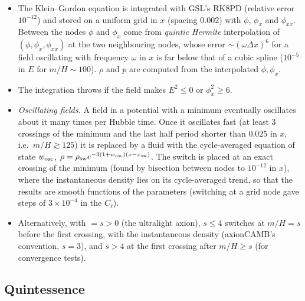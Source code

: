 \begin{implementation}
\begin{itemize}
\item The Klein--Gordon equation is integrated with GSL's RK8PD (relative error $10^{-12}$) and stored on a uniform
      grid in $x$ (spacing $0.002$) with $\phi$, $\phi_x$ and $\phi_{xx}$. Between the nodes $\phi$ and $\phi_x$ come
      from \emph{quintic Hermite} interpolation of $(\phi,\phi_x,\phi_{xx})$ at the two neighbouring nodes, whose error
      $\sim(\omega\Delta x)^6$ for a field oscillating with frequency $\omega$ in $x$ is far below that of a cubic spline
      ($10^{-5}$ in $E$ for $m/H\sim100$). $\rho$ and $p$ are computed from the interpolated $\phi,\phi_x$.
\item The integration throws if the field makes $E^2\le0$ or $\phi_x^2\ge6$.
\item \emph{Oscillating fields.} A field in a potential with a minimum eventually oscillates about it many times per
      Hubble time. Once it oscillates fast (at least 3 crossings of the minimum and the last half period shorter than
      $0.025$ in $x$, i.e.\ $m/H\gtrsim125$) it is replaced by a fluid with the cycle-averaged equation of state
      $w_{\rm osc}$, $\rho=\rho_{\rm sw}e^{-3(1+w_{\rm osc})(x-x_{\rm sw})}$. The switch is placed at an exact crossing
      of the minimum (found by bisection between nodes to $10^{-12}$ in $x$), where the instantaneous density lies on its
      cycle-averaged trend, so that the results are smooth functions of the parameters (switching at a grid node gave
      steps of $3\times10^{-4}$ in the $C_\ell$).
\item Alternatively, with  $=s>0$ (the ultralight axion), $s\le4$ switches at $m/H=s$
      before the first crossing, with the instantaneous density (axionCAMB's convention, $s=3$), and $s>4$ at the first
      crossing after $m/H\ge s$ (for convergence tests).
\end{itemize}
\end{implementation}

\subsection{Quintessence}

